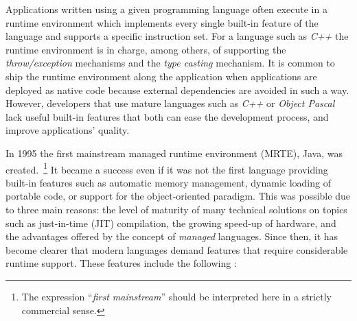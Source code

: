 Applications written using a given programming language often execute in a runtime environment which implements every single built-in feature of the language and supports a specific instruction set.
For a language such as \textit{C++} the runtime environment is in charge, among others, of supporting the \textit{throw/exception} mechanisms and the \textit{type casting} mechanism.
It is common to ship the runtime environment along the application when applications are deployed as native code because external dependencies are avoided in such a way.
However, developers that use mature languages such as \textit{C++} or \textit{Object Pascal} lack useful built-in features that both can ease the development process, and improve applications' quality.

In 1995 the first mainstream managed runtime environment (MRTE), Java, was created.~\footnote{The expression ``\textit{first mainstream}'' should be interpreted here in a strictly commercial sense.}
It became a success even if it was not the first language providing built-in features such as automatic memory management, dynamic loading of portable code, or support for the object-oriented paradigm.
This was possible due to three main reasons: the level of maturity of many technical solutions on topics such as just-in-time (JIT) compilation, the growing speed-up of hardware, and the advantages offered by the concept of \textit{managed} languages.
Since then, it has become clearer that modern languages demand features that require considerable runtime support.
These features include the following \cite{Cierniak2005}:

